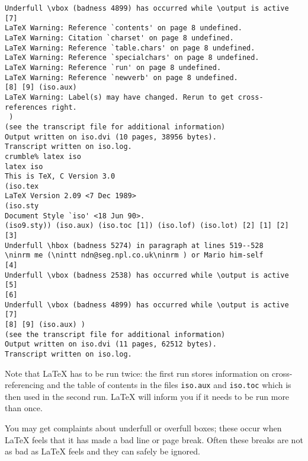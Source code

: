\begin{verbatim}
Underfull \vbox (badness 4899) has occurred while \output is active [7]
LaTeX Warning: Reference `contents' on page 8 undefined.
LaTeX Warning: Citation `charset' on page 8 undefined.
LaTeX Warning: Reference `table.chars' on page 8 undefined.
LaTeX Warning: Reference `specialchars' on page 8 undefined.
LaTeX Warning: Reference `run' on page 8 undefined.
LaTeX Warning: Reference `newverb' on page 8 undefined.
[8] [9] (iso.aux)
LaTeX Warning: Label(s) may have changed. Rerun to get cross-references right.
 )
(see the transcript file for additional information)
Output written on iso.dvi (10 pages, 38956 bytes).
Transcript written on iso.log.
crumble% latex iso
latex iso
This is TeX, C Version 3.0
(iso.tex
LaTeX Version 2.09 <7 Dec 1989>
(iso.sty
Document Style `iso' <18 Jun 90>.
(iso9.sty)) (iso.aux) (iso.toc [1]) (iso.lof) (iso.lot) [2] [1] [2] [3]
Underfull \hbox (badness 5274) in paragraph at lines 519--528
\ninrm me (\nintt ndn@seg.npl.co.uk\ninrm ) or Mario him-self
[4]
Underfull \vbox (badness 2538) has occurred while \output is active [5]
[6]
Underfull \vbox (badness 4899) has occurred while \output is active [7]
[8] [9] (iso.aux) )
(see the transcript file for additional information)
Output written on iso.dvi (11 pages, 62512 bytes).
Transcript written on iso.log.
\end{verbatim}

Note that LaTeX has to be run twice: the first run stores information on
cross-referencing and the table of contents in the files {\tt iso.aux} 
and {\tt iso.toc} which is then used in the second run.
LaTeX will inform you if it needs to be run more than once.

You may get complaints about underfull or overfull boxes; these occur when
LaTeX feels that it has made a bad line or page break.
Often these breaks are not as bad as LaTeX feels and they can safely be
ignored.
\twocolumn

